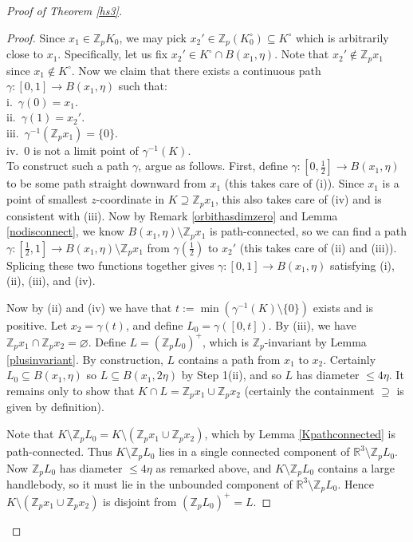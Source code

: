 \documentclass[12pt]{article}
\theoremstyle{plain}
\theoremstyle{definition}
\theoremstyle{remark}
\numberwithin{equation}{section}
\begin{document}
\begin{proof}[Proof of Theorem \ref{hs3}]
\begin{proof}
Since $x_1\in\mathbb Z_pK_0$, we may pick $x_2'\in\mathbb Z_p(K_0^\circ)\subseteq K^\circ$ which is arbitrarily close to $x_1$.  Specifically, let us fix $x_2'\in K^\circ\cap B(x_1,\eta)$.  Note that $x_2'\notin\mathbb Z_px_1$ since $x_1\notin K^\circ$.  Now we claim that there exists a continuous path $\gamma:[0,1]\to B(x_1,\eta)$ such that:\\
\indent i.\ $\gamma(0)=x_1$.\\
\indent ii.\ $\gamma(1)=x_2'$.\\
\indent iii.\ $\gamma^{-1}(\mathbb Z_px_1)=\{0\}$.\\
\indent iv.\ $0$ is not a limit point of $\gamma^{-1}(K)$.\\
To construct such a path $\gamma$, argue as follows.  First, define $\gamma:[0,\frac 12]\to B(x_1,\eta)$ to be some path straight downward from $x_1$ (this takes care of (i)).  Since $x_1$ is a point of smallest $z$-coordinate in $K\supseteq\mathbb Z_px_1$, this also takes care of (iv) and is consistent with (iii).  Now by Remark \ref{orbithasdimzero} and Lemma \ref{nodisconnect}, we know $B(x_1,\eta)\setminus\mathbb Z_px_1$ is path-connected, so we can find a path $\gamma:[\frac 12,1]\to B(x_1,\eta)\setminus\mathbb Z_px_1$ from $\gamma(\frac 12)$ to $x_2'$ (this takes care of (ii) and (iii)).  Splicing these two functions together gives $\gamma:[0,1]\to B(x_1,\eta)$ satisfying (i), (ii), (iii), and (iv).

Now by (ii) and (iv) we have that $t:=\min(\gamma^{-1}(K)\setminus\{0\})$ exists and is positive.  Let $x_2=\gamma(t)$, and define $L_0=\gamma([0,t])$.  By (iii), we have $\mathbb Z_px_1\cap\mathbb Z_px_2=\varnothing$.  Define $L=(\mathbb Z_pL_0)^+$, which is $\mathbb Z_p$-invariant by Lemma \ref{plusinvariant}.  By construction, $L$ contains a path from $x_1$ to $x_2$.  Certainly $L_0\subseteq B(x_1,\eta)$ so $L\subseteq B(x_1,2\eta)$ by Step 1(ii), and so $L$ has diameter $\leq 4\eta$.  It remains only to show that $K\cap L=\mathbb Z_px_1\cup\mathbb Z_px_2$ (certainly the containment $\supseteq$ is given by definition).

Note that $K\setminus\mathbb Z_pL_0=K\setminus(\mathbb Z_px_1\cup\mathbb Z_px_2)$, which by Lemma \ref{Kpathconnected} is path-connected.  Thus $K\setminus\mathbb Z_pL_0$ lies in a single connected component of $\mathbb R^3\setminus\mathbb Z_pL_0$.  Now $\mathbb Z_pL_0$ has diameter $\leq 4\eta$ as remarked above, and $K\setminus\mathbb Z_pL_0$ contains a large handlebody, so it must lie in the unbounded component of $\mathbb R^3\setminus\mathbb Z_pL_0$.  Hence $K\setminus(\mathbb Z_px_1\cup\mathbb Z_px_2)$ is disjoint from $(\mathbb Z_pL_0)^+=L$.
\end{proof}


\end{proof}
\end{document}

